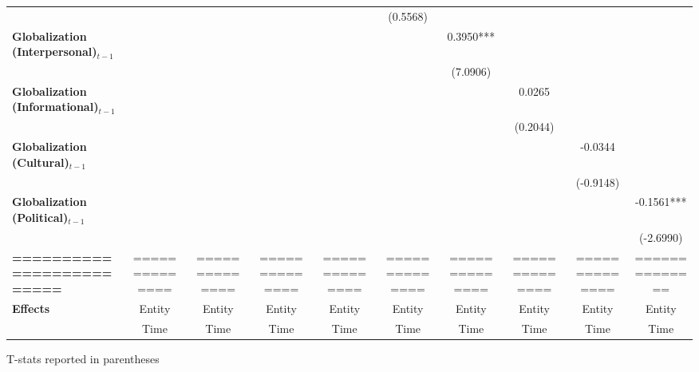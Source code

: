 \begin{center}
\begin{tabular}{lccccccccc}
\textbf{ }                         &                &                  &                  &                  &     (0.5568)     &                  &                  &                  &                   \\
\textbf{Globalization (Interpersonal)$_{t-1}$}             &                &                  &                  &                  &                  &    0.3950***     &                  &                  &                   \\
\textbf{ }                         &                &                  &                  &                  &                  &     (7.0906)     &                  &                  &                   \\
\textbf{Globalization (Informational)$_{t-1}$}             &                &                  &                  &                  &                  &                  &      0.0265      &                  &                   \\
\textbf{ }                         &                &                  &                  &                  &                  &                  &     (0.2044)     &                  &                   \\
\textbf{Globalization (Cultural)$_{t-1}$}             &                &                  &                  &                  &                  &                  &                  &     -0.0344      &                   \\
\textbf{ }                         &                &                  &                  &                  &                  &                  &                  &    (-0.9148)     &                   \\
\textbf{Globalization (Political)$_{t-1}$}             &                &                  &                  &                  &                  &                  &                  &                  &    -0.1561***     \\
\textbf{ }                         &                &                  &                  &                  &                  &                  &                  &                  &    (-2.6990)      \\
\textbf{=========================} & ============== &  ==============  &  ==============  &  ==============  &  ==============  &  ==============  &  ==============  &  ==============  &  ==============   \\
\textbf{Effects}                   &     Entity     &      Entity      &      Entity      &      Entity      &      Entity      &      Entity      &      Entity      &      Entity      &      Entity       \\
\textbf{}                          &      Time      &       Time       &       Time       &       Time       &       Time       &       Time       &       Time       &       Time       &       Time        \\
\bottomrule
\end{tabular}
\end{center}

T-stats reported in parentheses